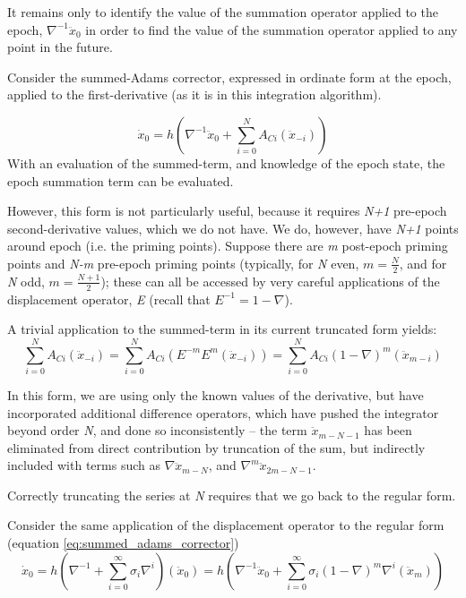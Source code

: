 It remains only to identify the value of the summation operator applied
to the epoch,  $\nabla ^{-1}{\ddot{x}}_{0}$ in order to find the value of the
summation operator applied to any point in the future.

Consider the summed-Adams corrector, expressed in ordinate form at the
epoch, applied to the first-derivative (as it is in this integration algorithm).

\begin{equation*}
\dot x_{0}=h\left(\nabla ^{-1}{\ddot{x}}_{0}+\sum
_{i=0}^{N}A_{{Ci}}({\ddot{x}}_{-i})\right)
\end{equation*}
With an evaluation of the summed-term, and knowledge of the epoch state,
the epoch summation term can be evaluated.

However, this form is not particularly useful, because it requires \textit{N+1}
pre-epoch second-derivative values, which we do not have. We do, however,
have \textit{N+1} points around epoch (i.e. the priming points). Suppose there are
\textit{m} post-epoch priming points and \textit{N-m}
pre-epoch priming points (typically, for \textit{N} even,  $m=\frac{N}{2}$,
and for \textit{N} odd,  $m=\frac{N+1}{2}$); these can all be accessed
by very careful applications of the displacement
operator, \textit{E} (recall that $E^{-1} = 1-\nabla $).

A trivial application to the summed-term in its current truncated form yields:
\begin{equation*}
\sum _{i=0}^{N}A_{Ci}({\ddot{x}}_{-i}) =
\sum_{i=0}^{N}A_{Ci}(E^{-m}E^{m}({\ddot{x}}_{-i})) =
\sum_{i=0}^{N}A_{Ci}(1-\nabla )^{m}({\ddot{x}}_{m-i})
\end{equation*}

In this form, we are using only the known values of the derivative, but
have incorporated additional difference operators, which have pushed
the integrator beyond order \textit{N}, and done so inconsistently --
the term $\ddot{x}_{m-N-1}$ has been eliminated from direct contribution by
truncation of the sum, but indirectly included with terms such as 
$\nabla  \ddot{x}_{m-N}$, and $\nabla ^m \ddot{x}_{2m-N-1}$.

Correctly truncating the series at \textit{N} requires that we go
back to the regular form.

Consider the same application of the displacement operator to the regular form
(equation \ref{eq:summed_adams_corrector})
\begin{equation*}
\dot x_{0}=h\left(\nabla ^{-1}+\sum _{i=0}^{\infty }\sigma
_{i}\nabla ^{i}\right)(\ddot{x}_{0})=
h\left(\nabla ^{-1}{\ddot{x}}_{0}+\sum _{i=0}^{\infty}\sigma
_{i}(1-\nabla )^{m}\nabla ^{i}(\ddot{x}_{m})\right)
\end{equation*}

